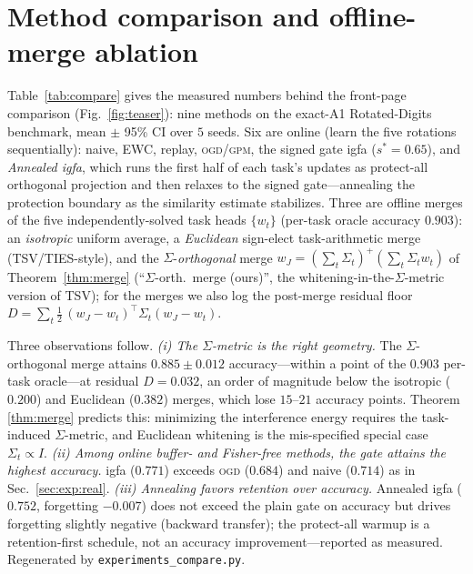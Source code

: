 \documentclass[10pt,a4paper]{article}
\theoremstyle{plain}
\theoremstyle{definition}
\newcommand{\Sig}{\Sigma}
\newcommand{\sstar}{s^{\ast}}
\newcommand{\IGFA}{igfa}
\newcommand{\OGD}{\textsc{ogd}}
\begin{document}
\section{Method comparison and offline-merge ablation}
\label{si:compare}
Table~\ref{tab:compare} gives the measured numbers behind the front-page comparison
(Fig.~\ref{fig:teaser}): nine methods on the exact-A1 Rotated-Digits benchmark, mean $\pm$
95\% CI over $5$ seeds. Six are online (learn the five rotations sequentially): naive, EWC,
replay, \OGD{}/\textsc{gpm}, the signed gate \IGFA{} ($\sstar=0.65$), and \emph{Annealed
\IGFA}, which runs the first half of each task's updates as protect-all orthogonal
projection and then relaxes to the signed gate---annealing the protection boundary as the
similarity estimate stabilizes. Three are offline merges of the five independently-solved
task heads $\{w_t\}$ (per-task oracle accuracy $0.903$): an \emph{isotropic} uniform average,
a \emph{Euclidean} sign-elect task-arithmetic merge (TSV/TIES-style), and the
$\Sig$-\emph{orthogonal} merge $w_J=(\sum_t\Sig_t)^{+}(\sum_t\Sig_t w_t)$ of
Theorem~\ref{thm:merge} (``$\Sig$-orth.\ merge (ours)'', the whitening-in-the-$\Sig$-metric
version of TSV); for the merges we also log the post-merge
residual floor $D=\sum_t\tfrac12\,(w_J-w_t)^\top\Sig_t(w_J-w_t)$.

Three observations follow. \emph{(i) The $\Sig$-metric is the right geometry.} The
$\Sig$-orthogonal merge attains $0.885\pm0.012$ accuracy---within a point of the
$0.903$ per-task oracle---at residual $D=0.032$, an order of magnitude below the isotropic
($0.200$) and Euclidean ($0.382$) merges, which lose $15$--$21$ accuracy points. Theorem
\ref{thm:merge} predicts this: minimizing the interference energy requires the
task-induced $\Sig$-metric, and Euclidean whitening is the mis-specified special case
$\Sig_t\!\propto\!I$. \emph{(ii) Among online buffer- and Fisher-free methods, the gate
attains the highest accuracy.} \IGFA{} ($0.771$) exceeds \OGD{} ($0.684$) and naive ($0.714$)
as in Sec.~\ref{sec:exp:real}. \emph{(iii) Annealing favors retention over accuracy.} Annealed
\IGFA{} ($0.752$, forgetting $-0.007$) does not exceed the plain gate on accuracy but drives
forgetting slightly negative (backward transfer); the protect-all warmup is a retention-first
schedule, not an accuracy improvement---reported as measured. Regenerated by
\texttt{experiments\_compare.py}.
\end{document}

